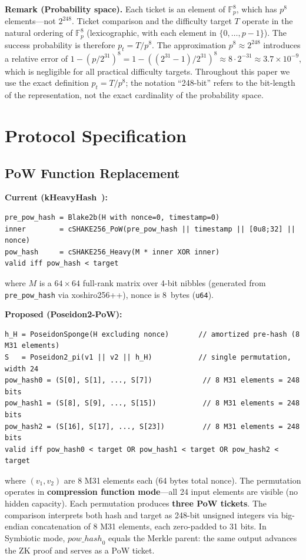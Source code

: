 \documentclass[11pt,a4paper]{article}
\begin{document}
\textbf{Remark (Probability space).} Each ticket is an element of $\mathbb{F}_p^8$, which has $p^8$ elements---not $2^{248}$. Ticket comparison and the difficulty target $T$ operate in the natural ordering of $\mathbb{F}_p^8$ (lexicographic, with each element in $\{0, \ldots, p-1\}$). The success probability is therefore $p_t = T/p^8$. The approximation $p^8 \approx 2^{248}$ introduces a relative error of $1 - (p/2^{31})^8 = 1 - ((2^{31}-1)/2^{31})^8 \approx 8 \cdot 2^{-31} \approx 3.7 \times 10^{-9}$, which is negligible for all practical difficulty targets. Throughout this paper we use the exact definition $p_t = T/p^8$; the notation ``248-bit'' refers to the bit-length of the representation, not the exact cardinality of the probability space.

\section{Protocol Specification}
\label{sec:protocol}

\subsection{PoW Function Replacement}
\label{sec:pow-replacement}

\textbf{Current (kHeavyHash~\cite{kaspa}):}
\begin{Verbatim}[fontsize=\small]
pre_pow_hash = Blake2b(H with nonce=0, timestamp=0)
inner        = cSHAKE256_PoW(pre_pow_hash || timestamp || [0u8;32] || nonce)
pow_hash     = cSHAKE256_Heavy(M * inner XOR inner)
valid iff pow_hash < target
\end{Verbatim}
where $M$ is a $64\times64$ full-rank matrix over 4-bit nibbles (generated from \texttt{pre\_pow\_hash} via xoshiro256++), nonce is 8~bytes (\texttt{u64}).

\textbf{Proposed (Poseidon2-PoW):}
\begin{Verbatim}[fontsize=\small]
h_H = PoseidonSponge(H excluding nonce)       // amortized pre-hash (8 M31 elements)
S   = Poseidon2_pi(v1 || v2 || h_H)           // single permutation, width 24
pow_hash0 = (S[0], S[1], ..., S[7])            // 8 M31 elements = 248 bits
pow_hash1 = (S[8], S[9], ..., S[15])           // 8 M31 elements = 248 bits
pow_hash2 = (S[16], S[17], ..., S[23])         // 8 M31 elements = 248 bits
valid iff pow_hash0 < target OR pow_hash1 < target OR pow_hash2 < target
\end{Verbatim}
where $(v_1, v_2)$ are 8 M31 elements each (64 bytes total nonce). The permutation operates in \textbf{compression function mode}---all 24 input elements are visible (no hidden capacity). Each permutation produces \textbf{three PoW tickets}. The comparison interprets both hash and target as 248-bit unsigned integers via big-endian concatenation of 8 M31 elements, each zero-padded to 31 bits. In Symbiotic mode, $\mathit{pow\_hash}_0$ equals the Merkle parent: the same output advances the ZK proof and serves as a PoW ticket.
\end{document}
